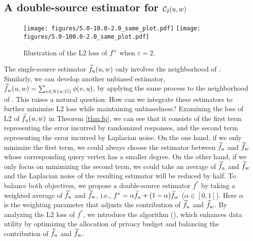 \subsection{A double-source estimator for $\mathcal{C}_2(u,w)$} 
\begin{figure}[tb]
\centering  
\texttt{[image: figures/5.0-10.0-2.0\_same\_plot.pdf]}
\texttt{[image: figures/5.0-100.0-2.0\_same\_plot.pdf]}
\myspace
\myspace
\caption{Illustration of the L2 loss of $f^*$ when $\varepsilon = 2$.}
\label{fig:variancecompare}
\end{figure}



The single-source estimator $\widetilde{f}_u(u,w)$ only involves the neighborhood of \vq. Similarly, we can develop another unbiased estimator, $\widetilde{f}_w(u,w)= \sum_{ v \in N(w, G) } \phi(v, u)$, by applying the same process to the neighborhood of \vx. 
This raises a natural question: How can we integrate these estimators to further minimize L2 loss while maintaining unbiasedness? 
Examining the loss of L2 of $\widetilde{f}_u(u,w)$ in Theorem \ref{thm:fq}, we can see that it consists of the first term representing the error incurred by randomized responses, and the second term representing the error incurred by Laplacian noise. 
On the one hand, if we only minimize the first term, we could always choose the estimator between $\widetilde{f}_u$ and $\widetilde{f}_w$ whose corresponding query vertex has a smaller degree. 
On the other hand, if we only focus on minimizing the second term, we could take an average of $\widetilde{f}_u$ and $\widetilde{f}_w$ and the Laplacian noise of the resulting estimator will be reduced by half. 
To balance both objectives, we propose a double-source estimator $f^*$ by taking a weighted average of $\widetilde{f}_u$ and $\widetilde{f}_w$, i.e., $f^* = \alpha \widetilde{f}_u+ (1 - \alpha) \widetilde{f}_w$ ($\alpha \in [0,1]$). 
Here $\alpha$ is the weighting parameter that adjusts the contribution of $\widetilde{f}_u$ and $\widetilde{f}_w$. 
By analyzing the L2 loss of $f^*$, we introduce the \advdslong algorithm (\advds), which enhances data utility by optimizing the allocation of privacy budget and balancing the contribution of $\widetilde{f}_u$ and $\widetilde{f}_w$. 

